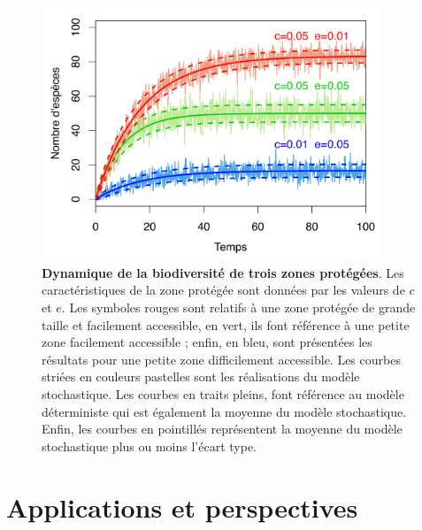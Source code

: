 \begin{figure}[h!]
\centering
\includegraphics[width=0.9\textwidth]{annexe1/fig/figAnnI2.pdf}
\caption[Dynamique de la biodiversité de trois zones protégées]{\textbf{Dynamique de la biodiversité de trois zones protégées}. Les caractéristiques de la zone protégée sont données par les valeurs de $c$ et $e$. Les symboles rouges sont relatifs à une zone protégée de grande taille et facilement accessible, en vert, ils font référence à une petite zone facilement accessible ; enfin, en bleu, sont présentées les résultats pour une petite zone difficilement accessible. Les courbes striées en couleurs pastelles sont les réalisations du modèle stochastique. Les courbes en traits pleins, font référence au modèle déterministe qui est également la moyenne du modèle stochastique. Enfin, les courbes en pointillés représentent la moyenne du modèle stochastique plus ou moins l'écart type.}
\label{figAnnI2}
\end{figure}



\section*{Applications et perspectives}

